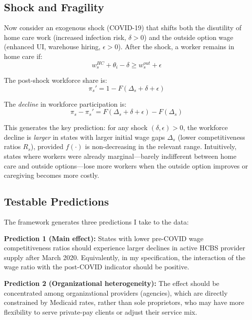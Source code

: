 \documentclass[12pt]{article}
\begin{document}
\subsection{Shock and Fragility}

Now consider an exogenous shock (COVID-19) that shifts both the disutility of home care work (increased infection risk, $\delta > 0$) and the outside option wage (enhanced UI, warehouse hiring, $\epsilon > 0$). After the shock, a worker remains in home care if:
\begin{equation}
w_s^{HC} + \theta_i - \delta \geq w_s^{out} + \epsilon
\end{equation}

The post-shock workforce share is:
\begin{equation}
\pi_s' = 1 - F(\Delta_s + \delta + \epsilon)
\end{equation}

The \textit{decline} in workforce participation is:
\begin{equation}
\pi_s - \pi_s' = F(\Delta_s + \delta + \epsilon) - F(\Delta_s)
\end{equation}

This generates the key prediction: for any shock $(\delta, \epsilon) > 0$, the workforce decline is \textit{larger} in states with larger initial wage gaps $\Delta_s$ (lower competitiveness ratios $R_s$), provided $f(\cdot)$ is non-decreasing in the relevant range. Intuitively, states where workers were already marginal---barely indifferent between home care and outside options---lose more workers when the outside option improves or caregiving becomes more costly.

\subsection{Testable Predictions}

The framework generates three predictions I take to the data:

\textbf{Prediction 1 (Main effect):} States with lower pre-COVID wage competitiveness ratios should experience larger declines in active HCBS provider supply after March 2020. Equivalently, in my specification, the interaction of the wage ratio with the post-COVID indicator should be positive.

\textbf{Prediction 2 (Organizational heterogeneity):} The effect should be concentrated among organizational providers (agencies), which are directly constrained by Medicaid rates, rather than sole proprietors, who may have more flexibility to serve private-pay clients or adjust their service mix.
\end{document}
